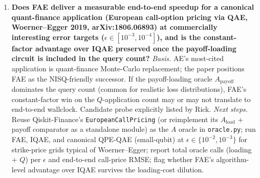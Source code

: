 \begin{enumerate}
\item \textbf{Does FAE deliver a measurable end-to-end speedup for a canonical quant-finance application (European call-option pricing via QAE, Woerner--Egger 2019, arXiv:1806.06893) at commercially interesting error targets ($\epsilon \in [10^{-3}, 10^{-4}]$), and is the constant-factor advantage over IQAE preserved once the payoff-loading circuit is included in the query count?}
\emph{Basis.} AE's most-cited application is quant-finance Monte-Carlo replacement; the paper positions FAE as the NISQ-friendly successor. If the payoff-loading oracle $A_{\mathrm{payoff}}$ dominates the query count (common for realistic loss distributions), FAE's constant-factor win on the $Q$-application count may or may not translate to end-to-end wallclock. Candidate probe explicitly listed by Rick.
\emph{Next steps.} Reuse Qiskit-Finance's \texttt{EuropeanCallPricing} (or reimplement its $A_{\mathrm{load}}$ + payoff comparator as a standalone module) as the $A$ oracle in \texttt{oracle.py}; run FAE, IQAE, and canonical QPE-QAE (small-qubit) at $\epsilon \in \{10^{-2}, 10^{-3}\}$ for strike-price grids typical of Woerner--Egger; report total oracle calls (loading + $Q$) per $\epsilon$ and end-to-end call-price RMSE; flag whether FAE's algorithm-level advantage over IQAE survives the loading-cost dilution.

\end{enumerate}

